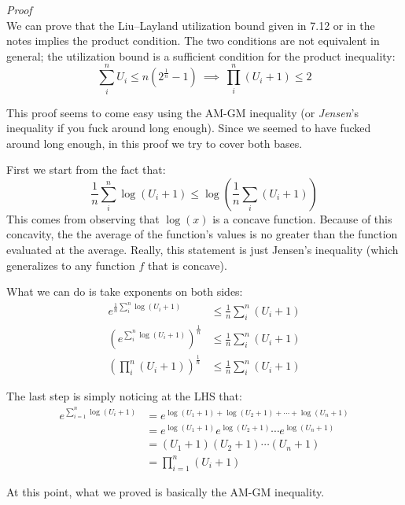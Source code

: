 \documentclass[a4paper,11pt]{article}
\begin{document}
\par\medskip

\textit{Proof} \\
We can prove that the Liu–Layland utilization bound given in 7.12 or in the notes implies the product condition. The two conditions are not equivalent in general; the utilization bound is a sufficient condition for the product inequality:
$$
	\sum_i^n U_i \leq n \left( 2^\frac{1}{n} - 1 \right)
	\ \implies \
	\prod_i^n (U_i + 1) \leq 2
$$

This proof seems to come easy using the AM-GM inequality (or \textit{Jensen}'s inequality if you fuck around long enough). Since we seemed to have fucked around long enough, in this proof we try to cover both bases.

First we start from the fact that:
$$
	\frac{1}{n} \sum_i^n \log \left( U_i + 1 \right) \leq \log \left( \frac{1}{n} \sum_i \left( U_i + 1 \right) \right)
$$
This comes from observing that $\log(x)$ is a concave function.
Because of this concavity, the the average of the function's values is no greater than the function evaluated at the average.
Really, this statement is just Jensen's inequality (which generalizes to any function $f$ that is concave).

What we can do is take exponents on both sides:
$$
	\begin{aligned}
		e^{ \frac{1}{n} \sum_i^n \log \left( U_i + 1 \right) }                & \leq \frac{1}{n} \sum_i^n \left( U_i + 1 \right) \\
		\left( e^{ \sum_i^n \log \left( U_i + 1 \right) } \right)^\frac{1}{n} & \leq \frac{1}{n} \sum_i^n \left( U_i + 1 \right) \\
		\left( \prod_i^n \left( U_i + 1\right) \right)^\frac{1}{n}            & \leq \frac{1}{n} \sum_i^n \left( U_i + 1 \right)
	\end{aligned}
$$

The last step is simply noticing at the LHS that:
$$
	\begin{aligned}
		e^{\sum_{i=1}^{n}\log(U_i+1)}
		 & = e^{\log(U_1+1)+\log(U_2+1)+\cdots+\log(U_n+1)}       \\[6pt]
		 & = e^{\log(U_1+1)}e^{\log(U_2+1)}\cdots e^{\log(U_n+1)} \\[6pt]
		 & = (U_1+1)(U_2+1)\cdots(U_n+1)                          \\[6pt]
		 & = \prod_{i=1}^{n}(U_i+1)
	\end{aligned}
$$

At this point, what we proved is basically the AM-GM inequality.
\end{document}
